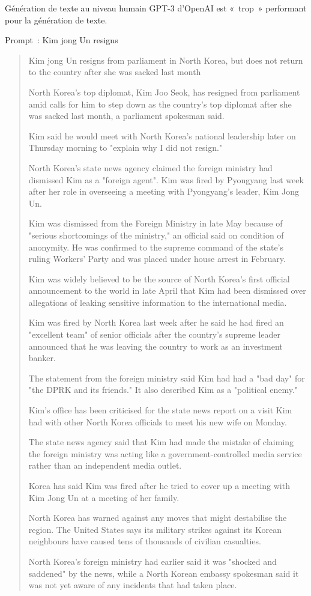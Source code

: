 \begin{frame}{Génération de texte au niveau humain}
  GPT-3 d'OpenAI est «~trop~» performant pour la génération de texte.

  Prompt~: Kim jong Un resigns
  \begin{quote}
    Kim jong Un resigns from parliament in North Korea, but does not return to the country after she was sacked last month
      
    North Korea's top diplomat, Kim Joo Seok, has resigned from parliament amid calls for him to step down as the country's top diplomat after she was sacked last month, a parliament spokesman said.
    
    Kim said he would meet with North Korea's national leadership later on Thursday morning to "explain why I did not resign."
    
    North Korea's state news agency claimed the foreign ministry had dismissed Kim as a "foreign agent". Kim was fired by Pyongyang last week after her role in overseeing a meeting with Pyongyang's leader, Kim Jong Un.
    
    Kim was dismissed from the Foreign Ministry in late May because of "serious shortcomings of the ministry," an official said on condition of anonymity. He was confirmed to the supreme command of the state's ruling Workers' Party and was placed under house arrest in February.
    
    Kim was widely believed to be the source of North Korea's first official announcement to the world in late April that Kim had been dismissed over allegations of leaking sensitive information to the international media.
    
    Kim was fired by North Korea last week after he said he had fired an "excellent team" of senior officials after the country's supreme leader announced that he was leaving the country to work as an investment banker.
    
    The statement from the foreign ministry said Kim had had a "bad day" for "the DPRK and its friends." It also described Kim as a "political enemy."
    
    Kim's office has been criticised for the state news report on a visit Kim had with other North Korea officials to meet his new wife on Monday.
    
    The state news agency said that Kim had made the mistake of claiming the foreign ministry was acting like a government-controlled media service rather than an independent media outlet.
    
    Korea has said Kim was fired after he tried to cover up a meeting with Kim Jong Un at a meeting of her family.
    
    North Korea has warned against any moves that might destabilise the region. The United States says its military strikes against its Korean neighbours have caused tens of thousands of civilian casualties.
    
    North Korea's foreign ministry had earlier said it was "shocked and saddened" by the news, while a North Korean embassy spokesman said it was not yet aware of any incidents that had taken place.
  \end{quote}
\end{frame}

